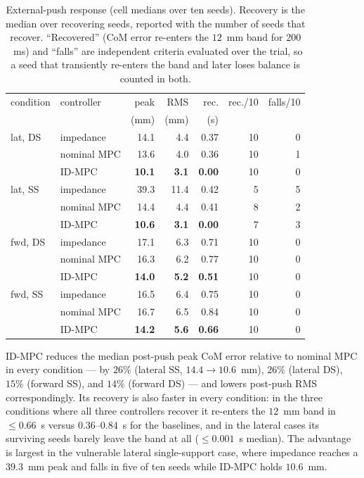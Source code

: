 \documentclass[journal]{IEEEtran}
\theoremstyle{plain}
\theoremstyle{definition}
\theoremstyle{remark}
\begin{document}
\begin{table}[t]
\centering
\caption{External-push response (cell medians over ten seeds). Recovery is the median over recovering seeds, reported with the number of seeds that recover. ``Recovered'' (CoM error re-enters the $12$~mm band for $200$~ms) and ``falls'' are independent criteria evaluated over the trial, so a seed that transiently re-enters the band and later loses balance is counted in both.}
\label{tab:push}
\begin{tabular}{@{}llrrrrr@{}}
\toprule
condition & controller & peak & RMS & rec. & rec./10 & falls/10\\
 & & (mm) & (mm) & (s) & & \\
\midrule
lat, DS & impedance & 14.1 & 4.4 & 0.37 & 10 & 0\\
 & nominal MPC & 13.6 & 4.0 & 0.36 & 10 & 1\\
 & ID-MPC & \textbf{10.1} & \textbf{3.1} & \textbf{0.00} & 10 & 0\\
lat, SS & impedance & 39.3 & 11.4 & 0.42 & 5 & 5\\
 & nominal MPC & 14.4 & 4.4 & 0.41 & 8 & 2\\
 & ID-MPC & \textbf{10.6} & \textbf{3.1} & \textbf{0.00} & 7 & 3\\
fwd, DS & impedance & 17.1 & 6.3 & 0.71 & 10 & 0\\
 & nominal MPC & 16.3 & 6.2 & 0.77 & 10 & 0\\
 & ID-MPC & \textbf{14.0} & \textbf{5.2} & \textbf{0.51} & 10 & 0\\
fwd, SS & impedance & 16.5 & 6.4 & 0.75 & 10 & 0\\
 & nominal MPC & 16.7 & 6.5 & 0.84 & 10 & 0\\
 & ID-MPC & \textbf{14.2} & \textbf{5.6} & \textbf{0.66} & 10 & 0\\
\bottomrule
\end{tabular}
\end{table}

ID-MPC reduces the median post-push peak CoM error relative to nominal MPC in every condition --- by $26\%$ (lateral SS, $14.4\to10.6$~mm), $26\%$ (lateral DS), $15\%$ (forward SS), and $14\%$ (forward DS) --- and lowers post-push RMS correspondingly. Its recovery is also faster in every condition: in the three conditions where all three controllers recover it re-enters the $12$~mm band in $\le0.66$~s versus $0.36$--$0.84$~s for the baselines, and in the lateral cases its surviving seeds barely leave the band at all ($\le0.001$~s median). The advantage is largest in the vulnerable lateral single-support case, where impedance reaches a $39.3$~mm peak and falls in five of ten seeds while ID-MPC holds $10.6$~mm.
\end{document}
